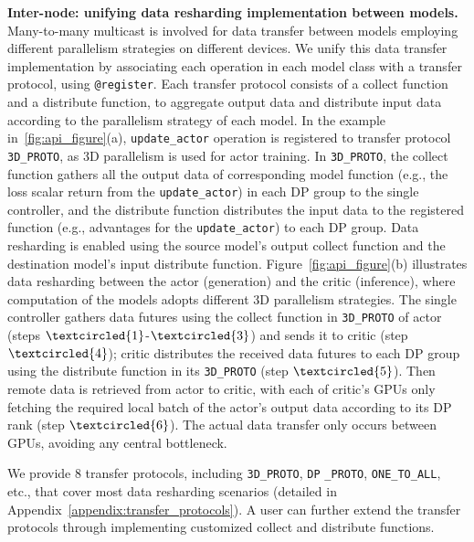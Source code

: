 \vspace{0.5mm}
\noindent\textbf{Inter-node: unifying data resharding implementation between models.} 
Many-to-many multicast is involved for data transfer between models employing different parallelism strategies on different devices. %
We unify this data transfer implementation
by associating each operation in each model class with a transfer protocol, using \verb|@register|. 
Each transfer protocol consists of a collect function and a distribute function, to aggregate output data 
 and distribute input data 
according to the parallelism strategy of each model. In the example in~\autoref{fig:api_figure}(a), \texttt{update\_actor} operation is 
{registered to}
transfer protocol \texttt{3D\_PROTO}, as 3D parallelism is used for actor training.
In \texttt{3D\_PROTO}, the collect function gathers all the {output data of corresponding model function (e.g., the loss scalar return from the \texttt{update\_actor})}
in each DP group to the single controller, and the distribute function distributes the input data {to the registered function (e.g., advantages for the \texttt{update\_actor})}
to each DP group. %
Data resharding is enabled using the source model's output collect function and the destination model's input distribute function. 
Figure~\ref{fig:api_figure}(b) illustrates data resharding between the actor (generation) and the critic (inference), where computation of the models adopts different 3D parallelism strategies.
The single controller gathers data futures using the collect function in \verb|3D_PROTO| of actor (steps $\textcircled{1}$-$\textcircled{3}$)  and sends it to 
critic (step $\textcircled{4}$); critic distributes the received data futures to each DP group using the distribute function in its \verb|3D_PROTO| (step $\textcircled{5}$).
Then %
remote data is retrieved from actor to critic, with each of critic's GPUs only fetching the required local batch of the actor's output data according to its DP rank (step $\textcircled{6}$). The actual data transfer only occurs between GPUs, avoiding any central bottleneck. 


We provide 8 transfer protocols, including \verb|3D_PROTO|, \verb|DP| \verb|_PROTO|, \verb|ONE_TO_ALL|, etc., that cover %
most data resharding scenarios 
({detailed in Appendix~\ref{appendix:transfer_protocols}}).
A user can further extend the transfer protocols %
through implementing customized collect and distribute functions.












